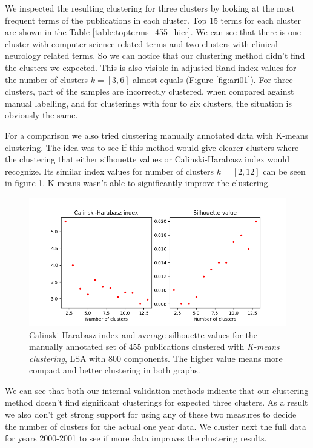 We inspected the resulting clustering for three clusters by 
looking at the most frequent terms of the publications in each 
cluster. Top 15 terms for each cluster are shown in the Table 
\ref{table:topterms_455_hier}. We can see that there is one cluster
with computer science related terms and two clusters with clinical
neurology related terms. So we can notice that our clustering method
didn't find the clusters we expected. This is also visible in 
adjusted Rand index values for the number of clusters $k=[3,6]$ almost 
equals (Figure \ref{fig:ari01}). For three clusters, part of the 
samples are incorrectly clustered, when compared against manual
labelling, and for clusterings with four to six clusters, the 
situation is obviously the same.



For a comparison we also tried clustering manually annotated data
with K-means clustering. The idea was to see if this method would
give clearer clusters where the clustering that either silhouette values or 
Calinski-Harabasz index would recognize. Its similar
index values for number of clusters $k=[2,12]$ can be seen in 
figure \ref{fig:ch-silh02}. K-means wasn't able to significantly 
improve the clustering.

\begin{figure}[htp]
  \begin{center}    
\includegraphics[width=11.5cm]{images/c-h-silh-index-plot-455-2_12-800-kmeans.png}
    \caption{Calinski-Harabasz index and average silhouette values for the
    manually annotated set of 455 publications clustered with 
    \emph{K-means clustering}, LSA with 800 components. The higher
    value means more compact and better clustering in both graphs.}
    \label{fig:ch-silh02}
  \end{center}
\end{figure}

We can see that both our internal validation methods indicate that
our clustering method doesn't find significant clusterings for
expected three clusters.
As a result we also don't get strong support for using any of 
these two measures to decide the number of clusters for the actual 
one year data.
We cluster next the full data for years 2000-2001 to see if more 
data improves the clustering results.

